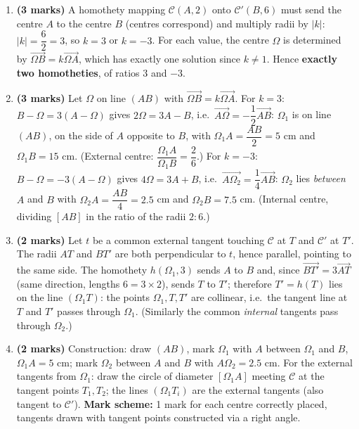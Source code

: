 \documentclass[11pt]{article}
\begin{document}
\begin{corrige}
\begin{enumerate}
\item \textbf{(3 marks)} A homothety mapping $\mathcal{C}(A,2)$ onto $\mathcal{C}'(B,6)$ must send the centre $A$ to the centre $B$ (centres correspond) and multiply radii by $|k|$: $|k| = \dfrac{6}{2} = 3$, so $k = 3$ or $k = -3$. For each value, the centre $\Omega$ is determined by $\overrightarrow{\Omega B} = k\overrightarrow{\Omega A}$, which has exactly one solution since $k \neq 1$. Hence \textbf{exactly two homotheties}, of ratios $\boxed{3}$ and $\boxed{-3}$.
\item \textbf{(3 marks)} Let $\Omega$ on line $(AB)$ with $\overrightarrow{\Omega B} = k\overrightarrow{\Omega A}$.
For $k = 3$: $B - \Omega = 3(A - \Omega)$ gives $2\Omega = 3A - B$, i.e.\ $\overrightarrow{A\Omega} = -\dfrac{1}{2}\overrightarrow{AB}$: $\Omega_1$ is on line $(AB)$, on the side of $A$ opposite to $B$, with $\Omega_1 A = \dfrac{AB}{2} = 5$ cm and $\Omega_1 B = 15$ cm. (External centre: $\dfrac{\Omega_1 A}{\Omega_1 B} = \dfrac{2}{6}$.)
For $k = -3$: $B - \Omega = -3(A - \Omega)$ gives $4\Omega = 3A + B$, i.e.\ $\overrightarrow{A\Omega_2} = \dfrac{1}{4}\overrightarrow{AB}$: $\Omega_2$ lies \emph{between} $A$ and $B$ with $\Omega_2 A = \dfrac{AB}{4} = 2.5$ cm and $\Omega_2 B = 7.5$ cm. (Internal centre, dividing $[AB]$ in the ratio of the radii $2:6$.)
\item \textbf{(2 marks)} Let $t$ be a common external tangent touching $\mathcal{C}$ at $T$ and $\mathcal{C}'$ at $T'$. The radii $AT$ and $BT'$ are both perpendicular to $t$, hence parallel, pointing to the same side. The homothety $h(\Omega_1, 3)$ sends $A$ to $B$ and, since $\overrightarrow{BT'} = 3\overrightarrow{AT}$ (same direction, lengths $6 = 3\times 2$), sends $T$ to $T'$; therefore $T' = h(T)$ lies on the line $(\Omega_1 T)$: the points $\Omega_1, T, T'$ are collinear, i.e.\ the tangent line at $T$ and $T'$ passes through $\Omega_1$. (Similarly the common \emph{internal} tangents pass through $\Omega_2$.)
\item \textbf{(2 marks)} Construction: draw $(AB)$, mark $\Omega_1$ with $A$ between $\Omega_1$ and $B$, $\Omega_1A = 5$ cm; mark $\Omega_2$ between $A$ and $B$ with $A\Omega_2 = 2.5$ cm. For the external tangents from $\Omega_1$: draw the circle of diameter $[\Omega_1 A]$ meeting $\mathcal{C}$ at the tangent points $T_1, T_2$; the lines $(\Omega_1 T_i)$ are the external tangents (also tangent to $\mathcal{C}'$). \textbf{Mark scheme:} 1 mark for each centre correctly placed, tangents drawn with tangent points constructed via a right angle.
\end{enumerate}
\end{corrige}
\end{document}
